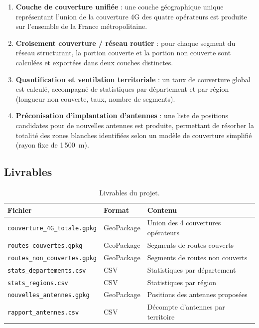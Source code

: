 \documentclass[11pt,a4paper]{article}
\begin{document}
\begin{enumerate}
  \item \textbf{Couche de couverture unifiée} : une couche géographique unique représentant l'union de la couverture 4G des quatre opérateurs est produite sur l'ensemble de la France métropolitaine.
  \item \textbf{Croisement couverture / réseau routier} : pour chaque segment du réseau structurant, la portion couverte et la portion non couverte sont calculées et exportées dans deux couches distinctes.
  \item \textbf{Quantification et ventilation territoriale} : un taux de couverture global est calculé, accompagné de statistiques par département et par région (longueur non couverte, taux, nombre de segments).
  \item \textbf{Préconisation d'implantation d'antennes} : une liste de positions candidates pour de nouvelles antennes est produite, permettant de résorber la totalité des zones blanches identifiées selon un modèle de couverture simplifié (rayon fixe de 1\,500~m).
\end{enumerate}

\subsection{Livrables}

\begin{table}[H]
  \centering
  \caption{Livrables du projet.}
  \begin{tabular}{lll}
    \toprule
    \textbf{Fichier} & \textbf{Format} & \textbf{Contenu} \\
    \midrule
    \texttt{couverture\_4G\_totale.gpkg}  & GeoPackage & Union des 4 couvertures opérateurs \\
    \texttt{routes\_couvertes.gpkg}       & GeoPackage & Segments de routes couverts \\
    \texttt{routes\_non\_couvertes.gpkg}  & GeoPackage & Segments de routes non couverts \\
    \texttt{stats\_departements.csv}      & CSV        & Statistiques par département \\
    \texttt{stats\_regions.csv}           & CSV        & Statistiques par région \\
    \texttt{nouvelles\_antennes.gpkg}     & GeoPackage & Positions des antennes proposées \\
    \texttt{rapport\_antennes.csv}        & CSV        & Décompte d'antennes par territoire \\
    \bottomrule
  \end{tabular}
\end{table}
\end{document}
